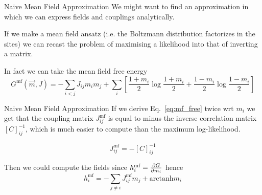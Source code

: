 \documentclass[handout]{beamer}
\newcommand{\arctanh}{\text{arctanh}}
\begin{document}
\begin{frame}{Naive Mean Field Approximation}
    We might want to find an approximation in which we can express
    \alert{fields} and \alert{couplings} analytically.

    If we make a \alert{mean field} ansatz (i.e. the Boltzmann distribution
    factorizes in the sites) we can recast the problem of maximising a
    likelihood into that of inverting a matrix.

    In fact we can take the mean field free energy
    \begin{equation}
        G^{\text{mf}}(\vec m, J) = - \sum_{i<j} J_{ij} m_i m_j +
        \sum_i \left[ \frac{1+m_i}{2} \log \frac{1+m_i}{2} + \frac{1-m_i}{2}
        \log \frac{1-m_i}{2} \right]
        \label{eq:mf_free}
    \end{equation}
\end{frame}

\begin{frame}{Naive Mean Field Approximation}
    If we derive Eq.~\ref{eq:mf_free} twice wrt $m_i$ we get that the coupling
    matrix $J^{\text{mf}}_{ij}$ is equal to minus the inverse correlation matrix
    $[C]_{ij}^{-1}$, which is much easier to compute than the maximum
    log-likelihood.

    \begin{equation}
        J^{\text{mf}}_{ij} = - [C]_{ij}^{-1}
    \end{equation}

    Then we could compute the fields since $h_i^{\text{mf}}=\pdv{G}{m_i}$ hence
    \begin{equation}
    h_i^{\text{mf}} = -\sum_{j\neq i} J_{ij}^{\text{mf}} m_j + \arctanh{m_i}
    \end{equation}
    \cite[17]{inverse}
\end{frame}
\end{document}
